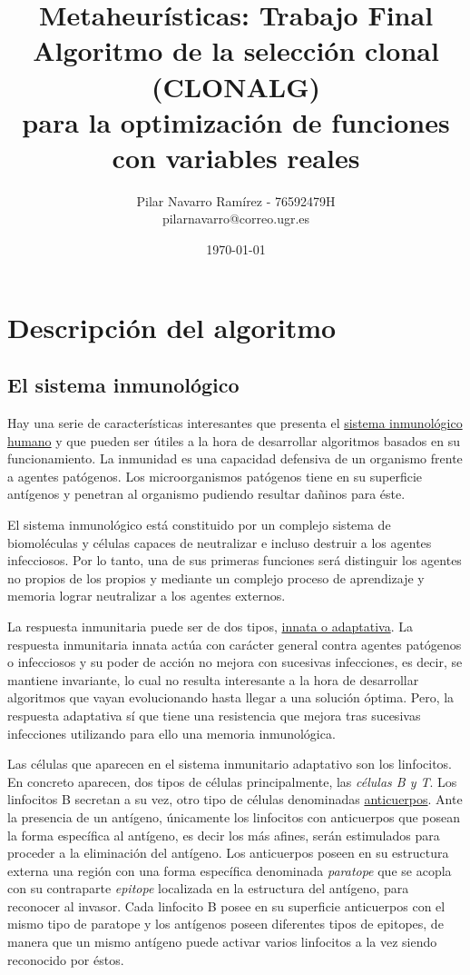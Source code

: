 \documentclass[10pt,a4paper]{article}
\title{\textbf{\huge Metaheurísticas: Trabajo Final }
	\\\medskip \Large Algoritmo de la selección clonal (CLONALG)\\ para la optimización de funciones con variables reales \\\medskip}
\author{Pilar Navarro Ramírez - 76592479H \\ pilarnavarro@correo.ugr.es }
\date{ \today }
\begin{document}
	
	
	\maketitle 
	\newpage
	\tableofcontents
	\newpage
	
	
	
	\section{Descripción del algoritmo}
	
	\subsection{El sistema inmunológico}
	
	Hay una serie de características interesantes que presenta el \underline{sistema
	inmunológico humano} y que pueden ser útiles a la hora de desarrollar algoritmos
	basados en su funcionamiento. La inmunidad es una capacidad
	defensiva de un organismo frente a agentes patógenos. Los microorganismos patógenos tiene en su superficie
	antígenos y penetran al organismo pudiendo resultar dañinos para éste.
	
	El sistema inmunológico está constituido por un
	complejo sistema de biomoléculas y células capaces de neutralizar e incluso destruir
	a los agentes infecciosos. Por lo tanto, una de sus primeras funciones será distinguir
	los agentes no propios de los propios y mediante un complejo proceso de
	aprendizaje y memoria lograr neutralizar a los agentes externos.
	
	La respuesta inmunitaria puede ser de dos tipos, \underline{innata o adaptativa}. La respuesta inmunitaria innata actúa con carácter general contra agentes patógenos o infecciosos y su poder de acción no
	mejora con sucesivas infecciones, es decir, se mantiene invariante, lo cual no resulta
	interesante a la hora de desarrollar algoritmos que vayan evolucionando hasta
	llegar a una solución óptima. Pero, la respuesta adaptativa sí que tiene una
	resistencia que mejora tras sucesivas infecciones utilizando para ello una memoria
	inmunológica.
	
		Las células que aparecen en el sistema inmunitario adaptativo son los linfocitos. En concreto aparecen, dos tipos de células principalmente, las \textit{células B y T}.
	Los linfocitos B secretan a su vez, otro tipo de células denominadas \underline{anticuerpos}. Ante la
	presencia de un antígeno, únicamente los linfocitos con anticuerpos que posean la forma
	específica al antígeno, es decir los más afines, serán estimulados para proceder a la eliminación
	del antígeno. Los anticuerpos poseen en su estructura externa una región con una forma
	específica denominada \textit{paratope} que se acopla con su contraparte \textit{epitope} localizada en la
	estructura del antígeno, para reconocer al invasor. Cada linfocito B posee en su superficie
	anticuerpos con el mismo tipo de paratope y los antígenos poseen diferentes tipos de epitopes,
	de manera que un mismo antígeno puede activar varios linfocitos a la vez siendo reconocido por
	éstos.
		
\end{document}
